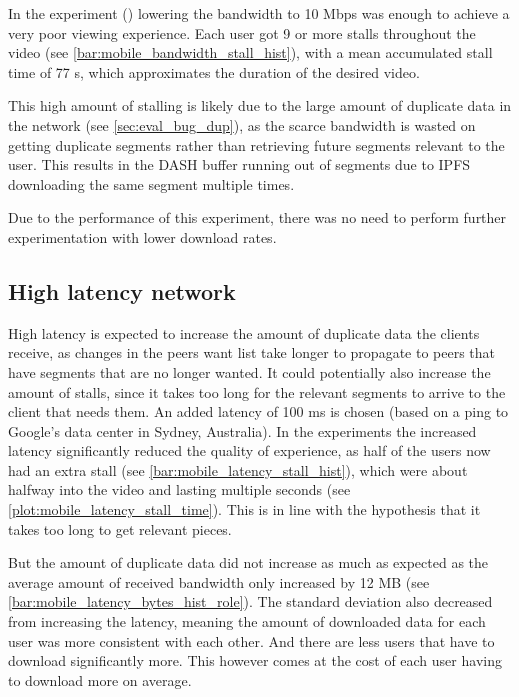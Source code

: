 In the experiment () lowering the bandwidth to 10 \ac{Mbps} was enough to achieve a very poor viewing experience. Each user got 9 or more stalls throughout the video (see \autoref{bar:mobile_bandwidth_stall_hist}), with a mean accumulated stall time of 77 \ac{s}, which approximates the duration of the desired video.

This high amount of stalling is likely due to the large amount of duplicate data in the network (see \autoref{sec:eval_bug_dup}), as the scarce bandwidth is wasted on getting duplicate segments rather than retrieving future segments relevant to the user. This results in the \ac{DASH} buffer running out of segments due to \ac{IPFS} downloading the same segment multiple times.

Due to the performance of this experiment, there was no need to perform further experimentation with lower download rates.

\if{}

\fi

\subsection{High latency network}
\label{sec:eval_high_latency}
High latency is expected to increase the amount of duplicate data the clients receive, as changes in the peers want list take longer to propagate to peers that have segments that are no longer wanted. It could potentially also increase the amount of stalls, since it takes too long for the relevant segments to arrive to the client that needs them. An added latency of 100 \ac{ms} is chosen (based on a ping to Google's data center in Sydney, Australia).
In the experiments the increased latency significantly reduced the quality of experience, as half of the users now had an extra stall (see \autoref{bar:mobile_latency_stall_hist}), which were about halfway into the video and lasting multiple seconds (see \autoref{plot:mobile_latency_stall_time}). This is in line with the hypothesis that it takes too long to get relevant pieces.

\if{}


\fi

But the amount of duplicate data did not increase as much as expected as the average amount of received bandwidth only increased by 12 \ac{MB} (see \autoref{bar:mobile_latency_bytes_hist_role}). The standard deviation also decreased from increasing the latency, meaning the amount of downloaded data for each user was more consistent with each other. And there are less users that have to download significantly more. This however comes at the cost of each user having to download more on average.

